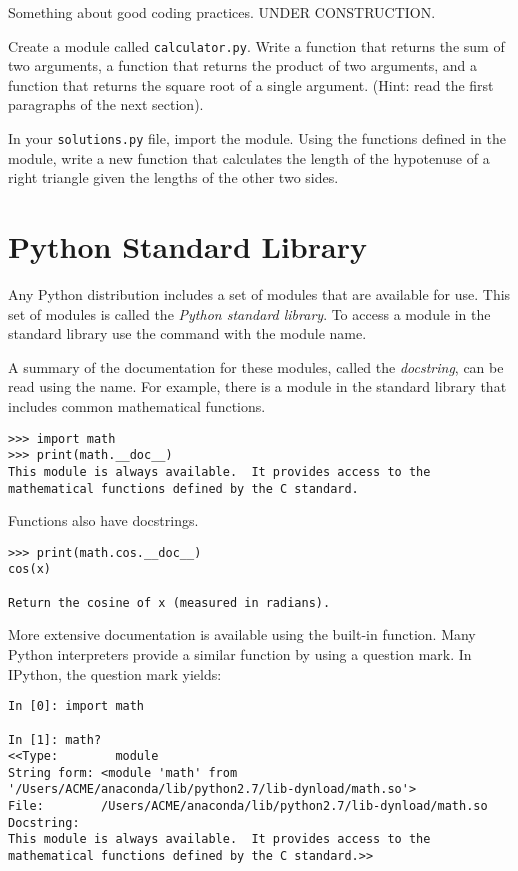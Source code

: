 Something about good coding practices. UNDER CONSTRUCTION.

\begin{problem}
Create a module called \texttt{calculator.py}.
Write a function that returns the sum of two arguments, a function that returns the product of two arguments, and a function that returns the square root of a single argument.
(Hint: read the first paragraphs of the next section).

In your \texttt{solutions.py} file, import the  module.
Using the functions defined in the module, write a new function that calculates the length of the hypotenuse of a right triangle given the lengths of the other two sides.
\end{problem}

\section*{Python Standard Library}

Any Python distribution includes a set of modules that are available for use.
This set of modules is called the \emph{Python standard library}.
To access a module in the standard library use the  command with the module name.

A summary of the documentation for these modules, called the \emph{docstring}, can be read using the  name.
For example, there is a  module in the standard library that includes common mathematical functions.
\begin{lstlisting}
>>> import math
>>> print(math.__doc__)
This module is always available.  It provides access to the
mathematical functions defined by the C standard.
\end{lstlisting}
Functions also have docstrings.
\begin{lstlisting}
>>> print(math.cos.__doc__)
cos(x)

Return the cosine of x (measured in radians).
\end{lstlisting}

More extensive documentation is available using the  built-in function.
Many Python interpreters provide a similar function by using a question mark.
In IPython, the question mark yields:

\begin{lstlisting}
In [0]: import math

In [1]: math?
<<Type:        module
String form: <module 'math' from '/Users/ACME/anaconda/lib/python2.7/lib-dynload/math.so'>
File:        /Users/ACME/anaconda/lib/python2.7/lib-dynload/math.so
Docstring:
This module is always available.  It provides access to the
mathematical functions defined by the C standard.>>
\end{lstlisting}

